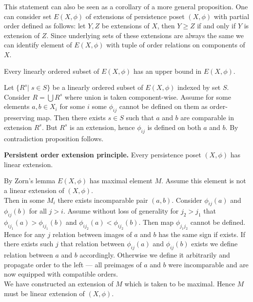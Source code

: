 This statement can also be seen as a corollary of a more general proposition.
One can consider set $E(X,\phi)$ of extensions of persistence poset $(X,\phi)$ with partial order defined as follows: let $Y,Z$ be extensions of $X$, then $Y \geq Z$ if and only if $Y$ is extension of $Z$. Since underlying sets of these extensions are always the same we can identify element of $E(X,\phi)$ with tuple of order relations on components of $X$.

\begin{proposition}
  Every linearly ordered subset of $E(X,\phi)$ has an upper bound in $E(X,\phi)$.
\end{proposition}

\begin{pf}
  Let $\{R^s|\;s \in S\}$ be a linearly ordered subset of $E(X,\phi)$ indexed by set $S$. Consider $R = \bigcup R^s$ where union is taken component-wise. Assume for some elements $a, b \in X_i$ for some $i$ some $\phi_{ij}$ cannot be defined on them as order-preserving map. Then there exists $s \in S$ such that $a$ and $b$ are comparable in extension $R^s$. But $R^s$ is an extension, hence $\phi_{ij}$ is defined on both $a$ and $b$. By contradiction proposition follows.
\end{pf}

\begin{proposition}
  \textbf{Persistent order extension principle.} Every persistence poset $(X,\phi)$ has linear extension.
\end{proposition}

\begin{pf}
  By Zorn's lemma $E(X,\phi)$ has maximal element $M$. Assume this element is not a linear extension of $(X,\phi)$.\\

  Then in some $M_i$ there exists incomparable pair $(a,b)$. Consider $\phi_{ij}(a)$ and $\phi_{ij}(b)$ for all $j > i$. Assume without loss of generality for $j_2 > j_1$ that $\phi_{ij_1}(a) > \phi_{ij_1}(b)$ and $\phi_{ij_2}(a) < \phi_{ij_2}(b)$. Then map $\phi_{j_1j_2}$ cannot be defined. Hence for any $j$ relation between images of $a$ and $b$ has the same sign if exists. If there exists such $j$ that relation between $\phi_{ij}(a)$ and $\phi_{ij}(b)$ exists we define relation between $a$ and $b$ accordingly. Otherwise we define it arbitrarily and propagate order to the left --- all preimages of $a$ and $b$ were incomparable and are now equipped with compatible orders.\\

  We have constructed an extension of $M$ which is taken to be maximal. Hence $M$ must be linear extension of $(X,\phi)$.
\end{pf}
